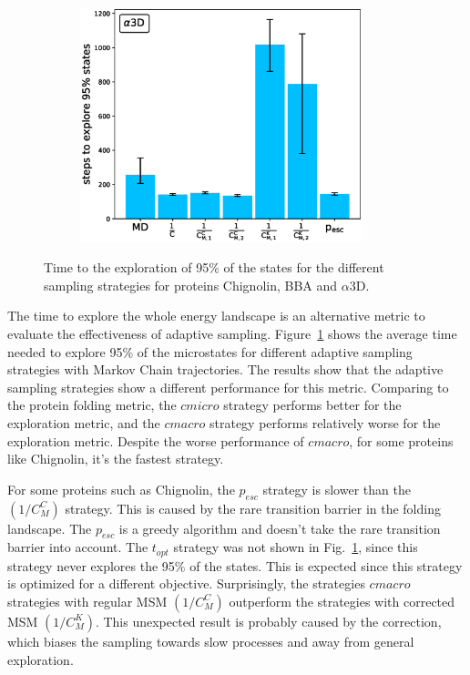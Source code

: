 \begin{figure}[H]
\begin{subfigure}[t]{0.5\textwidth}
    \includegraphics[width=0.9\textwidth]{figures/A3D_7_steps10000_nparallel100_explore.eps}   
  \end{subfigure}
  \caption{Time to the exploration of 95\% of the states for the different sampling strategies for proteins Chignolin, BBA and $\alpha$3D.}
  \label{fig:Time_explore}
\end{figure}

The time to explore the whole energy landscape is an alternative metric to evaluate the effectiveness of adaptive sampling. Figure~\ref{fig:Time_explore} shows the average time needed to explore 95\% of the microstates for different adaptive sampling strategies with Markov Chain trajectories.
The results show that the adaptive sampling strategies show a different performance for this metric. Comparing to the protein folding metric, the $cmicro$ strategy performs better for the exploration metric, and the $cmacro$  strategy performs relatively worse for the exploration metric. Despite the worse performance of $cmacro$, for some proteins like Chignolin, it's the fastest strategy. 


For some proteins such as Chignolin, the $p_{esc}$ strategy is slower than the $(1/C_M^C)$ strategy. This is caused by the rare transition barrier in the folding landscape. The $p_{esc}$ is a greedy algorithm and doesn't take the rare transition barrier into account. The $t_{opt}$ strategy was not shown in Fig.~\ref{fig:Time_explore}, since this strategy never explores the 95\% of the states. This is expected since this strategy is optimized for a different objective.
Surprisingly, the strategies $cmacro$ strategies with regular MSM $(1/C_M^C)$ outperform
the strategies with corrected MSM $(1/C_M^K)$. This unexpected result is probably caused by the correction, which biases the sampling towards slow processes and away from general exploration.

